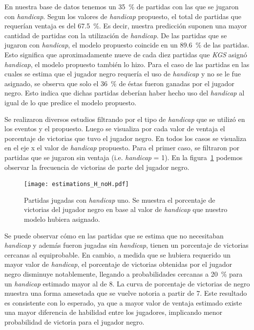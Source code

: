 \documentclass[11pt,twoside, spanish]{report} %
\begin{document}
En nuestra base de datos tenemos un \SI{35}{\percent} de partidas con las que se jugaron con \textit{handicap}.
Segun los valores de \textit{handicap} propuesto, el total de partidas que requer\'ian ventaja es del \SI{67.5}{\percent}.
Es decir, nuestra predicci\'on suponen una mayor cantidad de partidas con la utilizaci\'on de \textit{handicap}.
De las partidas que se jugaron con \textit{handicap}, el modelo propuesto coincide en un \SI{89.6}{\percent} de las partidas.
Esto significa que aproximadamente nueve de cada diez partidas que \textit{KGS} asign\'o \textit{handicap}, el modelo propuesto tambi\'en lo hizo.
Para el caso de las partidas en las cuales se estima que el jugador negro  requer\'ia el uso de \textit{handicap} y no se le fue asignado, se observa que solo el \SI{36}{\percent} de \'estas fueron ganadas por el jugador negro.
Esto indica que dichas partidas deber\'ian haber hecho uso del \textit{handicap} al igual de lo que predice el modelo propuesto.


Se realizaron diversos estudios filtrando por el tipo de \textit{handicap} que se utiliz\'o en los eventos y el propuesto.
Luego se visualiza por cada valor de ventaja el porcentaje de victorias que tuvo el jugador negro.
En todos los casos se visualiza en el eje x el valor de \textit{handicap} propuesto.
Para el primer caso, se filtraron por partidas que se jugaron sin ventaja (i.e. \textit{handicap} = 1). 
En la figura~\ref{fig:handicap_porcentaje_no_asignado} podemos observar la frecuencia de victorias de parte del jugador negro.


\begin{figure}[H]
    \centering
    \texttt{[image: estimations\_H\_noH.pdf]}
    \caption{Partidas jugadas con \textit{handicap} uno. Se muestra el porcentaje de victorias del jugador negro en base al valor de \textit{handicap} que nuestro modelo hubiera asignado.}
    \label{fig:handicap_porcentaje_no_asignado}
\end{figure}

Se puede observar c\'omo en las partidas que se estima que no necesitaban \textit{handicap} y adem\'as fueron jugadas sin \textit{handicap}, tienen un porcentaje de victorias cercanas al equiprobable.
En cambio, a medida que se hubiera requerido un mayor valor de \textit{handicap}, el porcentaje de victorias obtenidas por el jugador negro disminuye notablemente, llegando a probabilidades cercanas a \SI{20}{\percent} para un \textit{handicap} estimado mayor al de 8.
La curva de porcentaje de victorias de negro muestra una forma amesetada que se vuelve notoria a partir de 7.
Este resultado es consistente con lo esperado, ya que a mayor valor de ventaja estimado existe una mayor diferencia de habilidad entre los jugadores, implicando menor probabilidad de victoria para el jugador negro.
\end{document}
